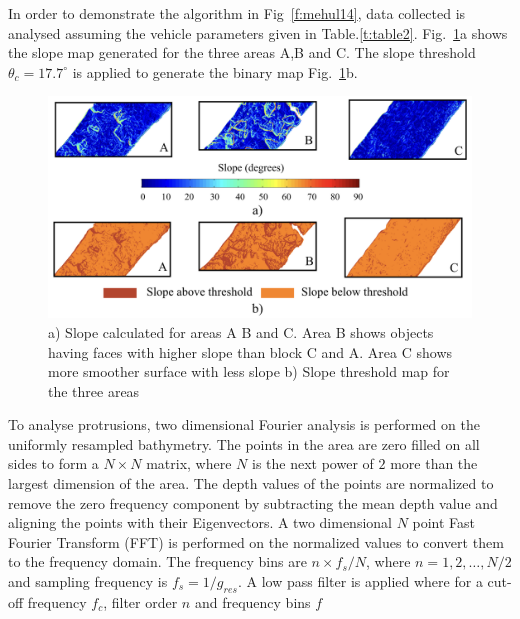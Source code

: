 

In order to demonstrate the algorithm in Fig~\ref{f:mehul14}, data collected is analysed assuming the vehicle parameters given in Table.\ref{t:table2}. Fig.~\ref{f:slope_analysis}a shows the slope map generated for the three areas A,B and C. The slope threshold $\theta_c= 17.7^\circ$ is applied to generate the binary map Fig.~\ref{f:slope_analysis}b.

\begin{figure}[!ht]
\centering
\includegraphics[width=6in]{./images/mehul15.png}
\caption{a) Slope calculated for areas A B and C. Area B shows objects having faces with higher slope than block C and A. Area C shows more smoother surface with less slope b) Slope threshold map for the three areas }
\label{f:slope_analysis}
\end{figure}

To analyse protrusions, two dimensional Fourier analysis is performed on the uniformly resampled bathymetry. The points in the area are zero filled on all sides to form a $N \times N$ matrix, where $N$ is the next power of $2$ more than the largest dimension of the area. The depth values of the points are normalized to remove the zero frequency component by subtracting the mean depth value and aligning the points with their Eigenvectors. A two dimensional $N$ point Fast Fourier Transform (FFT) is performed on the normalized values to convert them to the frequency domain. The frequency bins are $n \times f_s/N$, where $n = 1, 2, \dots, N/2$ and sampling frequency is $f_s = 1/g_{res}$. A low pass filter is applied where for a cut-off frequency $f_c$, filter order $n$ and frequency bins $f$

